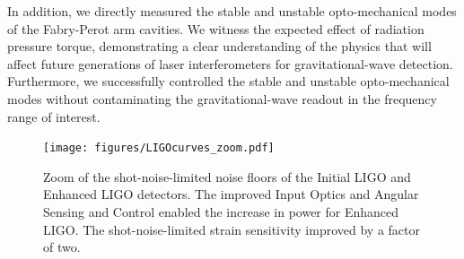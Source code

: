 In addition, we directly measured the stable and unstable
opto-mechanical modes of the Fabry-Perot arm cavities. We witness
the expected effect of radiation pressure torque, demonstrating a
clear understanding of the physics that will affect future generations
of laser interferometers for gravitational-wave
detection. Furthermore, we successfully controlled the stable and
unstable opto-mechanical modes without contaminating the
gravitational-wave readout in the frequency range of interest.

\begin{figure}
\begin{centering}
\texttt{[image: figures/LIGOcurves\_zoom.pdf]}
\caption[Zoom of the shot-noise-limited noise floors of the Initial
LIGO and Enhanced LIGO detectors.]{Zoom of the shot-noise-limited
  noise floors of the Initial LIGO and Enhanced LIGO detectors. The
  improved Input Optics and Angular Sensing and Control enabled the
  increase in power for Enhanced LIGO. The shot-noise-limited strain
  sensitivity improved by a factor of two.}
\label{fig:LIGOcurves}
\end{centering}
\end{figure}


